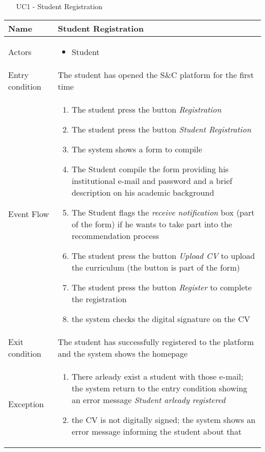 			\begin{table} [H]
				\centering
				\begin{itemize}
					\item [UC1] - Student Registration
				\end{itemize}
				\begin{tabular}{|| P{7.5cm} | P{7.5cm} ||}
					\hline
					Name & Student Registration \\
					\hline
					Actors & \parbox{5cm}{\begin{itemize}
							\item Student
							\end{itemize}
						} \\
					\hline
					Entry condition & The student has opened the S\&C platform for the first time \\
					\hline
					Event Flow & \parbox{5cm}{\begin{enumerate}
						\item The student press the button \textit{Registration}
						\item The student press the button \textit{Student Registration}
						\item The system shows a form to compile
						\item The Student compile the form providing his institutional e-mail and password and a brief description on his academic 
						background
						\item The Student flags the \textit{receive 
						notification} box (part of the form) 
						if he wants to take part into the recommendation process 
						\item The student press the button 
						\textit{Upload CV} to upload the 
						curriculum (the button is part of 
						the form)
						\item The student press the button 
						\textit{Register} to complete the 
						registration
						\item the system checks the digital signature on the CV
						\end{enumerate}} \\
					\hline 
					Exit condition & The student has successfully registered 
					to the platform and the system shows the 
					homepage \\
					\hline
					Exception &	\parbox{5cm}{\begin{enumerate}
							\item There arleady exist a student with 
							those e-mail; the system return to 
							the entry condition showing an 
							error message \textit{Student arleady 
							registered}
							\item the CV is not digitally signed; the system shows an error message informing the student about that
							\end{enumerate}} \\
					\hline
				\end{tabular}
			\end{table}
			
